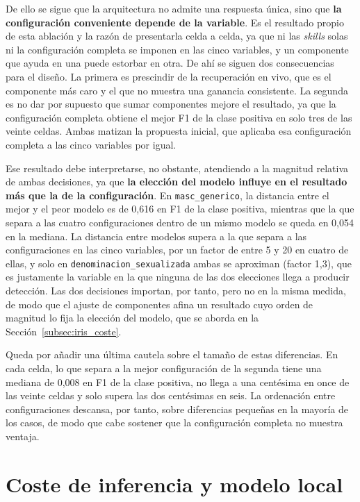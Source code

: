 De ello se sigue que la arquitectura no admite una respuesta única, sino que
\textbf{la configuración conveniente depende de la variable}. Es el resultado propio
de esta ablación y la razón de presentarla celda a celda, ya que ni las
\textit{skills} solas ni la configuración completa se imponen en las cinco variables,
y un componente que ayuda en una puede estorbar en otra. De ahí se siguen dos
consecuencias para el diseño. La primera es prescindir de la recuperación en vivo,
que es el componente más caro y el que no muestra una ganancia consistente. La
segunda es no dar por supuesto que sumar componentes mejore el resultado, ya que la
configuración completa obtiene el mejor F1 de la clase positiva en solo tres de las
veinte celdas. Ambas matizan la propuesta inicial, que aplicaba esa configuración
completa a las cinco variables por igual.

Ese resultado debe interpretarse, no obstante, atendiendo a la magnitud relativa de
ambas decisiones, ya que \textbf{la elección del modelo influye en el resultado más
que la de la configuración}. En
\texttt{masc\_generico}, la distancia entre el mejor y el peor modelo es de 0,616 en
F1 de la clase positiva, mientras que la que separa a las cuatro configuraciones
dentro de un mismo modelo se queda en 0,054 en la mediana. La distancia entre modelos
supera a la que separa a las configuraciones en las cinco variables, por un factor de
entre 5 y 20 en cuatro de ellas, y solo en \texttt{denominacion\_sexualizada} ambas
se aproximan (factor 1,3), que es justamente la variable en la que ninguna de las dos
elecciones llega a producir detección. Las dos decisiones importan, por tanto, pero no
en la misma medida, de modo que el ajuste de componentes afina un resultado cuyo orden
de magnitud lo fija la elección del modelo, que se aborda en la
Sección~\ref{subsec:iris_coste}.

Queda por añadir una última cautela sobre el tamaño de estas diferencias. En cada
celda, lo que separa a la mejor configuración de la segunda tiene una mediana de 0,008
en F1 de la clase positiva, no llega a una centésima en once de las veinte celdas y
solo supera las dos centésimas en seis. La ordenación entre configuraciones descansa,
por tanto, sobre diferencias pequeñas en la mayoría de los casos, de modo que cabe
sostener que la configuración completa no muestra ventaja.


\section{Coste de inferencia y modelo local}
\label{subsec:iris_local}\label{subsec:iris_coste}

